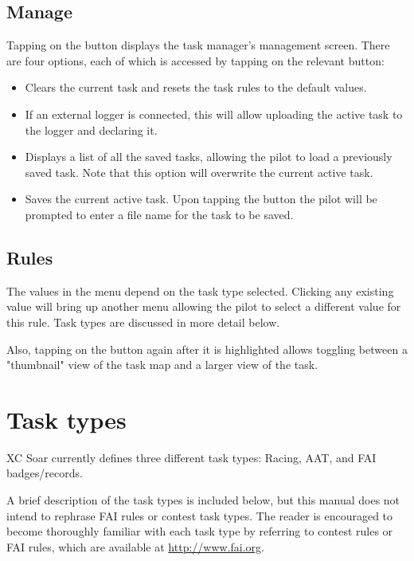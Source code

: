 \subsection*{Manage}
Tapping on the  button displays the task manager's management 
screen.  There are four options, each of which is accessed by tapping on the 
relevant button:

\begin{itemize}
\item {} Clears the current task and resets the task rules to 
  the default values.
\item {}  If an external logger is connected, this will allow 
  uploading the  active task to the logger and declaring it.
\item {} Displays a list of all the saved tasks, allowing the 
  pilot to load a previously saved task.  Note that this option will overwrite 
  the current active task.
\item {}  Saves the current active task.  Upon tapping the 
   button the pilot will be prompted to enter a file name for the 
  task to be saved.
\end{itemize}

\subsection*{Rules}
The values in the  menu depend on the task type selected.  Clicking 
any existing value will bring up another menu allowing the pilot to select a 
different value for this rule.  Task types are discussed in more detail below.

Also, tapping on the  button again after it is highlighted allows 
toggling between a "thumbnail" view of the task map and a larger view of the task.

\section{Task types}
XC Soar currently defines three different task types: Racing, AAT, and FAI badges/records.

A brief description of the task types is included below, but this manual does 
not intend to rephrase FAI rules or contest task types.  The reader is encouraged 
to become thoroughly familiar with each task type by referring to contest rules 
or FAI rules, which are available at \url{http://www.fai.org}. 


